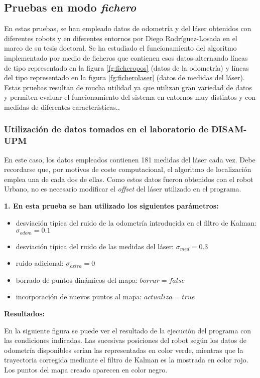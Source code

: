 \subsection{Pruebas en modo \emph{fichero}}
En estas pruebas, se han empleado datos de odometría y del láser obtenidos con diferentes robots y en diferentes entornos por Diego Rodríguez-Losada en el marco de su tesis doctoral. Se ha estudiado el funcionamiento del algoritmo implementado por medio de ficheros que contienen esos datos alternando líneas de tipo representado en la figura \ref{fg:ficheropos} (datos de la odometría) y líneas del tipo representado en la figura \ref{fg:ficherolaser} (datos de medidas del láser). Estas pruebas resultan de mucha utilidad ya que utilizan gran variedad de datos y permiten evaluar el funcionamiento del sistema en entornos muy distintos y con medidas de diferentes características..

\subsubsection{Utilización de datos tomados en el laboratorio de DISAM-UPM}
En este caso, los datos empleados contienen 181 medidas del láser cada vez. Debe recordarse que, por motivos de coste computacional, el algoritmo de localización emplea una de cada dos de ellas. Como estos datos fueron obtenidos con el robot Urbano, no es necesario modificar el \emph{offset} del láser utilizado en el programa.

\noindent
\textbf{\textbf{1.} En esta prueba se han utilizado los siguientes parámetros:}
\begin{itemize}
  \item desviación típica del ruido de la odometría introducida en el filtro de Kalman: $\sigma_{odom} = 0.1$
  \item desviación típica del ruido de las medidas del láser: $\sigma_{med} = 0.3$
  \item ruido adicional: $\sigma_{extra} = 0$
  \item borrado de puntos dinámicos del mapa: $borrar = false$
  \item incorporación de nuevos puntos al mapa: $actualiza = true$
\end{itemize}


\textbf{Resultados:}

En la siguiente figura se puede ver el resultado de la ejecución del programa con las condiciones indicadas. Las sucesivas posiciones del robot según los datos de odometría disponibles serían las representadas en color verde, mientras que la trayectoria corregida mediante el filtro de Kalman es la mostrada en color rojo. Los puntos del mapa creado aparecen en color negro.

